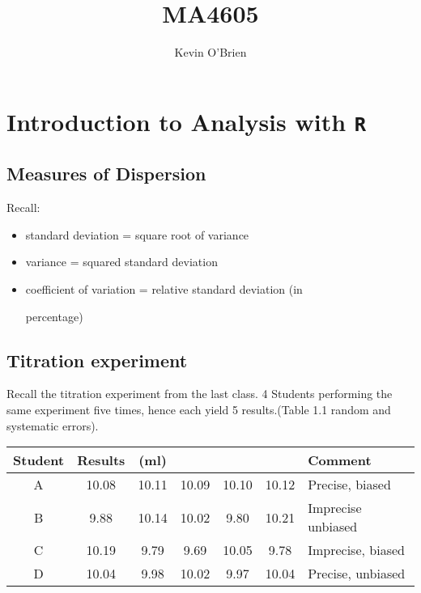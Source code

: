 \documentclass[12pt, a4paper]{article}
\begin{document}
	\author{Kevin O'Brien}
	\title{MA4605}
	
	\tableofcontents \setcounter{tocdepth}{2}
\newpage
\Large	
\section{Introduction to Analysis with \texttt{R} }

\subsection{Measures of Dispersion}

Recall:

\begin{itemize}
	
	\item standard deviation  = square root of variance
	
	\item variance = squared standard deviation
	
	\item coefficient of variation = relative standard deviation (in
	
	percentage)
	
\end{itemize}


\subsection{Titration experiment}



Recall the titration experiment from the last class. 4 Students performing the same experiment five times, hence each yield 5 results.(Table 1.1 random and systematic errors).

\begin{tabular}{|c|ccccc|l|}
	
	\hline
	
	
	Student & Results  & (ml) &  &  &  &Comment \\ \hline
	
	A & 10.08 & 10.11 &10.09 &10.10&10.12 & Precise, biased\\ \hline
	
	B & 9.88 &10.14& 10.02 &9.80& 10.21& Imprecise unbiased\\ \hline
	
	C & 10.19 &9.79& 9.69 &10.05& 9.78 & Imprecise, biased\\ \hline
	
	D & 10.04 &9.98 &10.02 &9.97 &10.04 & Precise, unbiased \\
	
	\hline
	
\end{tabular}\\
\end{document}
